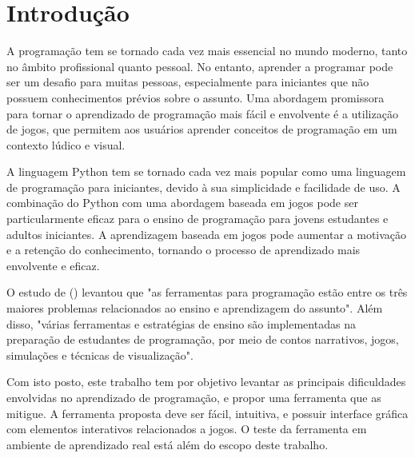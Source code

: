 \chapter[Introdução]{Introdução}

A programação tem se tornado cada vez mais essencial no mundo moderno, tanto no âmbito profissional quanto pessoal. No entanto, aprender a programar pode ser um desafio para muitas pessoas, especialmente para iniciantes que não possuem conhecimentos prévios sobre o assunto. Uma abordagem promissora para tornar o aprendizado de programação mais fácil e envolvente é a utilização de jogos, que permitem aos usuários aprender conceitos de programação em um contexto lúdico e visual.

A linguagem Python tem se tornado cada vez mais popular como uma linguagem de programação para iniciantes, devido à sua simplicidade e facilidade de uso. A combinação do Python com uma abordagem baseada em jogos pode ser particularmente eficaz para o ensino de programação para jovens estudantes e adultos iniciantes. A aprendizagem baseada em jogos pode aumentar a motivação e a retenção do conhecimento, tornando o processo de aprendizado mais envolvente e eficaz.

O estudo de \citeauthor{PereiraEtAll} (\citeyear{PereiraEtAll}) levantou que "as ferramentas para programação estão entre os três maiores problemas relacionados ao ensino e aprendizagem do assunto". Além disso, "várias ferramentas e estratégias de ensino são implementadas na preparação de estudantes de programação, por meio de contos narrativos, jogos, simulações e técnicas de visualização".

Com isto posto, este trabalho tem por objetivo levantar as principais dificuldades envolvidas no aprendizado de programação, e propor uma ferramenta que as mitigue. A ferramenta proposta deve ser fácil, intuitiva, e possuir interface gráfica com elementos interativos relacionados a jogos. O teste da ferramenta em ambiente de aprendizado real está além do escopo deste trabalho.